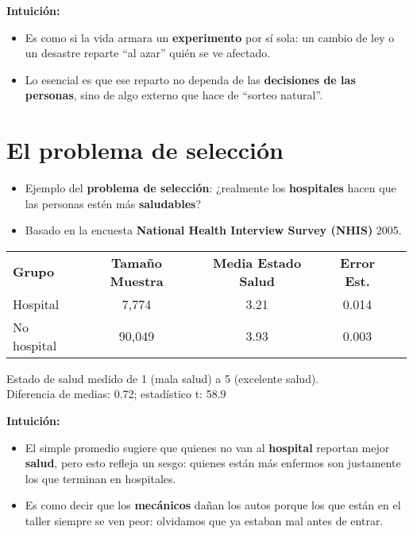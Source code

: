 \documentclass[12pt]{article}
\begin{document}
\textbf{Intuición:}
\begin{itemize}
    \item Es como si la vida armara un \textbf{experimento} por sí sola: un cambio de ley o un desastre reparte “al azar” quién se ve afectado.
    \item Lo esencial es que ese reparto no dependa de las \textbf{decisiones de las personas}, sino de algo externo que hace de “sorteo natural”.
\end{itemize}

\section*{\noindent\textbf{El problema de selección}}

\begin{itemize}
    \item Ejemplo del \textbf{problema de selección}: ¿realmente los \textbf{hospitales} hacen que las personas estén más \textbf{saludables}?
    \item Basado en la encuesta \textbf{National Health Interview Survey (NHIS)} 2005.
\end{itemize}

\begin{table}[H]
\centering
\begin{tabular}{lcccc}
\textbf{Grupo} & \textbf{Tamaño Muestra} & \textbf{Media Estado Salud} & \textbf{Error Est.} \\
Hospital & 7,774 & 3.21 & 0.014 \\
No hospital & 90,049 & 3.93 & 0.003 \\
\end{tabular}
\end{table}

\footnotesize
Estado de salud medido de 1 (mala salud) a 5 (excelente salud). \\
Diferencia de medias: 0.72; estadístico t: 58.9
\normalsize

\textbf{Intuición:}
\begin{itemize}
    \item El simple promedio sugiere que quienes no van al \textbf{hospital} reportan mejor \textbf{salud}, pero esto refleja un sesgo: quienes están más enfermos son justamente los que terminan en hospitales.
    \item Es como decir que los \textbf{mecánicos} dañan los autos porque los que están en el taller siempre se ven peor: olvidamos que ya estaban mal antes de entrar.
\end{itemize}
\end{document}
